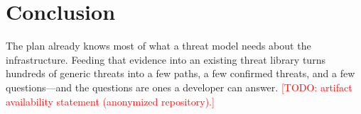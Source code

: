 \documentclass[sigconf,review,anonymous]{acmart}
\newcommand{\todo}[1]{\textcolor{red}{[TODO: #1]}}
\begin{document}
\section{Conclusion}

The plan already knows most of what a threat model needs about the infrastructure. Feeding that evidence into an existing
threat library turns hundreds of generic threats into a few paths, a few confirmed threats, and a few questions---and the
questions are ones a developer can answer. \todo{artifact availability statement (anonymized repository).}



\end{document}

